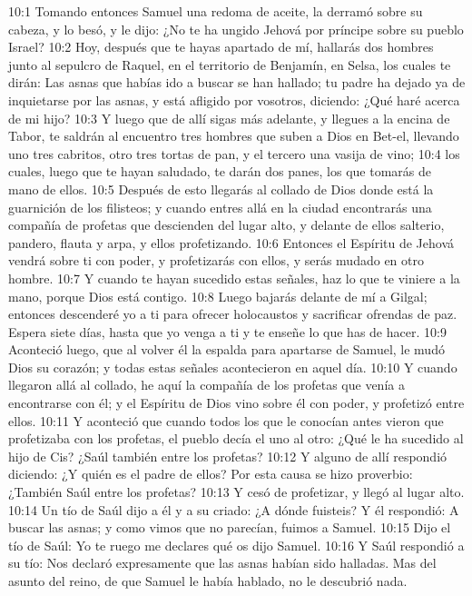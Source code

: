 10:1 Tomando entonces Samuel una redoma de aceite, la derramó sobre su cabeza, y lo besó, y le dijo: ¿No te ha ungido Jehová por príncipe sobre su pueblo Israel?  
10:2 Hoy, después que te hayas apartado de mí, hallarás dos hombres junto al sepulcro de Raquel, en el territorio de Benjamín, en Selsa, los cuales te dirán: Las asnas que habías ido a buscar se han hallado; tu padre ha dejado ya de inquietarse por las asnas, y está afligido por vosotros, diciendo: ¿Qué haré acerca de mi hijo?  
10:3 Y luego que de allí sigas más adelante, y llegues a la encina de Tabor, te saldrán al encuentro tres hombres que suben a Dios en Bet-el, llevando uno tres cabritos, otro tres tortas de pan, y el tercero una vasija de vino;  
10:4 los cuales, luego que te hayan saludado, te darán dos panes, los que tomarás de mano de ellos.  
10:5 Después de esto llegarás al collado de Dios donde está la guarnición de los filisteos; y cuando entres allá en la ciudad encontrarás una compañía de profetas que descienden del lugar alto, y delante de ellos salterio, pandero, flauta y arpa, y ellos profetizando.  
10:6 Entonces el Espíritu de Jehová vendrá sobre ti con poder, y profetizarás con ellos, y serás mudado en otro hombre.  
10:7 Y cuando te hayan sucedido estas señales, haz lo que te viniere a la mano, porque Dios está contigo.  
10:8 Luego bajarás delante de mí a Gilgal; entonces descenderé yo a ti para ofrecer holocaustos y sacrificar ofrendas de paz. Espera siete días, hasta que yo venga a ti y te enseñe lo que has de hacer.  
10:9 Aconteció luego, que al volver él la espalda para apartarse de Samuel, le mudó Dios su corazón; y todas estas señales acontecieron en aquel día.  
10:10 Y cuando llegaron allá al collado, he aquí la compañía de los profetas que venía a encontrarse con él; y el Espíritu de Dios vino sobre él con poder, y profetizó entre ellos.  
10:11 Y aconteció que cuando todos los que le conocían antes vieron que profetizaba con los profetas, el pueblo decía el uno al otro: ¿Qué le ha sucedido al hijo de Cis? ¿Saúl también entre los profetas?  
10:12 Y alguno de allí respondió diciendo: ¿Y quién es el padre de ellos? Por esta causa se hizo proverbio: ¿También Saúl entre los profetas?  
10:13 Y cesó de profetizar, y llegó al lugar alto.  
10:14 Un tío de Saúl dijo a él y a su criado: ¿A dónde fuisteis? Y él respondió: A buscar las asnas; y como vimos que no parecían, fuimos a Samuel.  
10:15 Dijo el tío de Saúl: Yo te ruego me declares qué os dijo Samuel.  
10:16 Y Saúl respondió a su tío: Nos declaró expresamente que las asnas habían sido halladas. Mas del asunto del reino, de que Samuel le había hablado, no le descubrió nada.  
